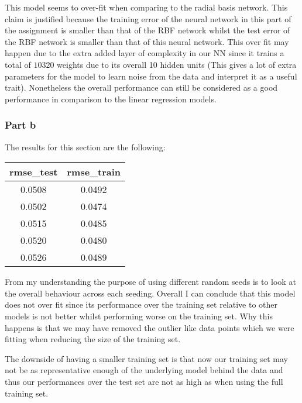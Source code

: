 \documentclass[11pt]{article}
\begin{document}
This model seems to over-fit  when  comparing to the radial basis
network. This claim is justified because the training error of the neural network in this part of the assignment is smaller than that of the RBF network whilst the test error of the RBF network is smaller than that of this neural network. This over fit may happen due to the extra added layer of complexity in our NN since it trains a total of $10320$ weights due to its overall 10 hidden units (This gives a lot of extra parameters for the model to learn noise from the data and interpret it as a useful trait). Nonetheless the overall performance can still be considered as a good performance in comparison to the linear regression models.

%
%
%
%
\subsubsection{Part b}

The results for this section are the following:
\begin{center}
\begin{tabular}{|c|c|}
\hline
 rmse\_test & rmse\_train \\
 \hline
0.0508 &  0.0492 \\
0.0502  & 0.0474 \\
0.0515 & 0.0485 \\
0.0520 & 0.0480 \\
0.0526 & 0.0489 \\
\hline
\end{tabular}
\end{center}

From my understanding the purpose of using different random seeds is to look at the overall behaviour across each seeding. Overall I can conclude that this model does not over fit since its performance over the training set relative to other models is not better whilst performing worse on the training set.  Why this happens is that we may have removed the outlier like data points which we were fitting when reducing the size of the training set.

The downside of having a smaller training set is that now our training set may not be as representative enough of the underlying model behind the data and thus our performances over the test set are not as high as when using the full training set.
\end{document}
